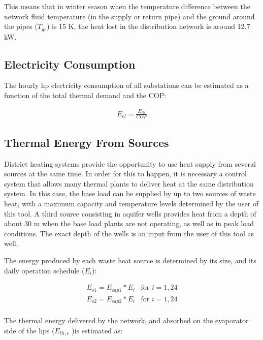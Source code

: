 \documentclass{article}
\begin{document}
This means that in winter season when the temperature difference between the network fluid temperature (in the supply or return pipe) and the ground around the pipes ($T_{gr}$) is 15 K, the heat lost in the distribution network is around 12.7 kW.


\subsection{Electricity Consumption}

The hourly \gls{hp} electricity consumption of all substations can be estimated as a function of the total thermal demand and the COP:

\begin{align*}
E_{el} = \frac{E_{th}}{COP}
\end{align*}

\subsection{Thermal Energy From Sources}

District heating systems provide the opportunity to use heat supply from several sources at the same time. In order for this to happen, it is necessary a control system that allows many thermal plants to deliver heat at the same distribution system. In this case, the base load can be supplied by up to two sources of waste heat, with a maximum capacity and temperature levels determined by the user of this tool. A third source consisting in aquifer wells provides heat from a depth of about 30 m when the base load plants are not operating, as well as in peak load conditions. The exact depth of the wells is an input from the user of this tool as well.

The energy produced by each waste heat source is determined by its size, and its daily operation schedule ($E_i$):

\begin{equation}
\label{eq:sources-energy}
\begin{array}{lll}
	E_{s1} = E_{cap1}* E_i  
    & \mbox{for } i =1,24 \\
	E_{s2} = E_{cap2}* E_i  
	& \mbox{for } i =1,24 \\
\end{array}
\end{equation}

The thermal energy delivered by the network, and absorbed on the evaporator side of the  \gls{hp}s ($E_{th,e}$ )is estimated as:
\end{document}
